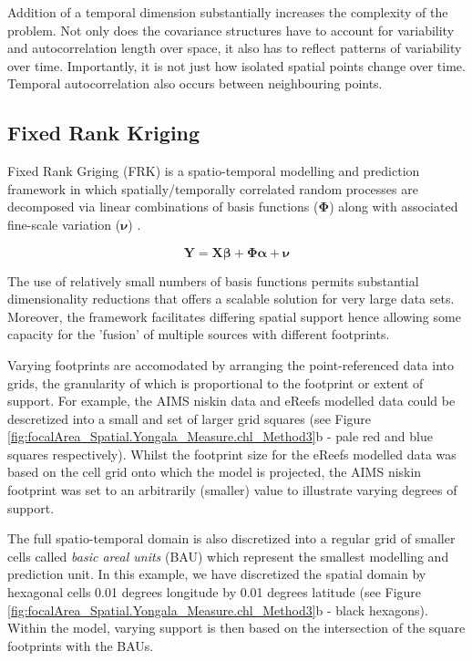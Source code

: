 Addition of a temporal dimension substantially increases the complexity of the problem.  Not only does the covariance structures have to account for variability and autocorrelation length
over space, it also has to reflect patterns of variability over time.  Importantly, it is not just how isolated spatial points change over time.  Temporal autocorrelation also occurs between
neighbouring points.


\subsection{Fixed Rank Kriging}

Fixed Rank Griging (FRK) is a spatio-temporal modelling and prediction framework
in which spatially/temporally correlated random processes are decomposed via
linear combinations of basis functions ($\boldsymbol{\Phi}$) along with associated fine-scale variation ($\boldsymbol{\nu}$) \citep{Cressie-2008-209}.

$$
\boldsymbol{Y} = \mathbold{X}\boldsymbol{\beta} + \boldsymbol{\Phi}\boldsymbol{\alpha} + \boldsymbol{\nu}
$$

The use of relatively small numbers of basis functions permits substantial dimensionality reductions that offers
a scalable solution for very large data sets.  Moreover, the framework facilitates differing spatial support hence allowing
some capacity for the 'fusion' of multiple sources with different footprints.

Varying footprints are accomodated by arranging the point-referenced data into grids,
the granularity of which is proportional to the footprint or extent of support.  For example,
the AIMS niskin data and eReefs modelled data could be descretized into a small and set of larger
grid squares (see Figure \ref{fig:focalArea_Spatial.Yongala_Measure.chl_Method3}b - pale red and blue squares respectively).
Whilst the footprint size for the eReefs modelled data was based on the cell grid onto which the model
is projected, the AIMS niskin footprint was set to an arbitrarily (smaller) value to illustrate varying
degrees of support.

The full spatio-temporal domain is also discretized into a regular grid of smaller cells called
\textit{basic areal units} (BAU) which represent the smallest modelling and prediction unit.
In this example, we have discretized the spatial domain by hexagonal cells 0.01 degrees longitude by 0.01 degrees latitude (see Figure \ref{fig:focalArea_Spatial.Yongala_Measure.chl_Method3}b - black hexagons).
Within the model, varying support is then based on the intersection of the square footprints with
the BAUs.

